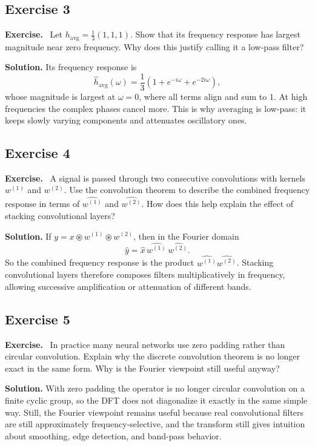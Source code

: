 \documentclass[11pt]{article}
\newenvironment{exercisebox}{\begin{framed}\noindent\textbf{Exercise.}\ }{\end{framed}}
\begin{document}
\subsection*{Exercise 3}
\begin{exercisebox}
Let $h_{\mathrm{avg}} = \frac{1}{3}(1,1,1)$.
Show that its frequency response has largest magnitude near zero frequency.
Why does this justify calling it a low-pass filter?
\end{exercisebox}
\textbf{Solution.} Its frequency response is
\[
\hat h_{\mathrm{avg}}(\omega)=\frac13(1+e^{-i\omega}+e^{-2i\omega}),
\]
whose magnitude is largest at $\omega=0$, where all terms align and sum to $1$. At high frequencies the complex phases cancel more. This is why averaging is low-pass: it keeps slowly varying components and attenuates oscillatory ones.

\subsection*{Exercise 4}
\begin{exercisebox}
A signal is passed through two consecutive convolutions with kernels $w^{(1)}$ and $w^{(2)}$.
Use the convolution theorem to describe the combined frequency response in terms of $\widehat{w^{(1)}}$ and $\widehat{w^{(2)}}$.
How does this help explain the effect of stacking convolutional layers?
\end{exercisebox}
\textbf{Solution.} If $y=x\circledast w^{(1)}\circledast w^{(2)}$, then in the Fourier domain
\[
\widehat y = \widehat x\,\widehat{w^{(1)}}\,\widehat{w^{(2)}}.
\]
So the combined frequency response is the product $\widehat{w^{(1)}}\widehat{w^{(2)}}$. Stacking convolutional layers therefore composes filters multiplicatively in frequency, allowing successive amplification or attenuation of different bands.

\subsection*{Exercise 5}
\begin{exercisebox}
In practice many neural networks use zero padding rather than circular convolution.
Explain why the discrete convolution theorem is no longer exact in the same form.
Why is the Fourier viewpoint still useful anyway?
\end{exercisebox}
\textbf{Solution.} With zero padding the operator is no longer circular convolution on a finite cyclic group, so the DFT does not diagonalize it exactly in the same simple way. Still, the Fourier viewpoint remains useful because real convolutional filters are still approximately frequency-selective, and the transform still gives intuition about smoothing, edge detection, and band-pass behavior.
\end{document}
